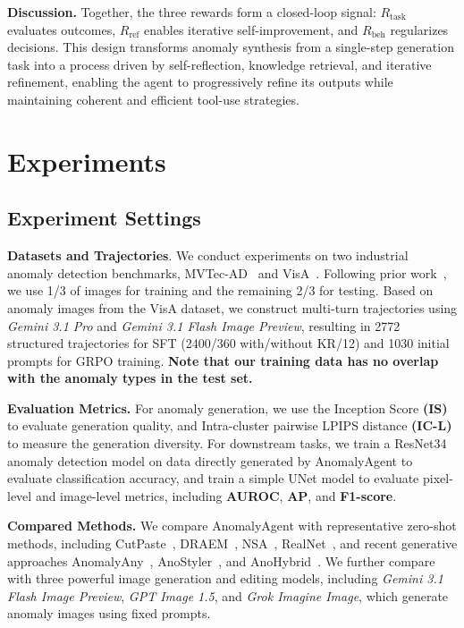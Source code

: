 \documentclass[sigconf]{acmart}
\begin{document}
\noindent\textbf{Discussion.}
Together, the three rewards form a closed-loop signal: $R_{\text{task}}$ evaluates outcomes, $R_{\text{ref}}$ enables iterative self-improvement, and $R_{\text{beh}}$ regularizes decisions. This design transforms anomaly synthesis from a single-step generation task into a process driven by self-reflection, knowledge retrieval, and iterative refinement, enabling the agent to progressively refine its outputs while maintaining coherent and efficient tool-use strategies.

\section{Experiments}

\subsection{Experiment Settings}
\textbf{Datasets and Trajectories}.
We conduct experiments on two industrial anomaly detection benchmarks, MVTec-AD~\cite{DBLP:journals/ijcv/BergmannBFSS21} and VisA~\cite{DBLP:conf/eccv/ZouJPZD22}. Following prior work~\cite{DBLP:conf/aaai/HuZYDCLWW24, DBLP:conf/cvpr/Zhao25}, we use 1/3 of images for training and the remaining 2/3 for testing. Based on anomaly images from the VisA dataset, we construct multi-turn trajectories using \emph{Gemini 3.1 Pro} and \emph{Gemini 3.1 Flash Image Preview}, resulting in 2772 structured trajectories for SFT (2400/360 with/without KR/12) and 1030 initial prompts for GRPO training. \textbf{Note that our training data has no  overlap with the anomaly types in the test set.}

\noindent\textbf{Evaluation Metrics.}
For anomaly generation, we use the Inception Score \textbf{(IS)} to evaluate generation quality, and Intra-cluster pairwise LPIPS distance \textbf{(IC-L)} to measure the generation diversity. For downstream tasks, we train a ResNet34 anomaly detection model on data directly generated by AnomalyAgent to evaluate classification accuracy, and train a simple UNet model to evaluate pixel-level and image-level metrics, including \textbf{AUROC}, \textbf{AP}, and \textbf{F1-score}.

\noindent\textbf{Compared Methods.}
We compare AnomalyAgent with representative zero-shot methods, including CutPaste~\cite{DBLP:conf/cvpr/LiSYP21}, DRAEM~\cite{DBLP:conf/iccv/ZavrtanikKS21}, NSA~\cite{DBLP:conf/eccv/SchluterTHK22}, RealNet~\cite{DBLP:conf/cvpr/Zhang0Z24}, and recent generative approaches AnomalyAny~\cite{DBLP:conf/cvpr/SunCDF25}, AnoStyler~\cite{DBLP:journals/corr/abs-2511-06687}, and AnoHybrid~\cite{DBLP:conf/cvpr/Zhao25}. We further compare with three powerful image generation and editing models, including \emph{Gemini 3.1 Flash Image Preview}, \emph{GPT Image 1.5}, and \emph{Grok Imagine Image}, which generate anomaly images using fixed prompts.
\end{document}

